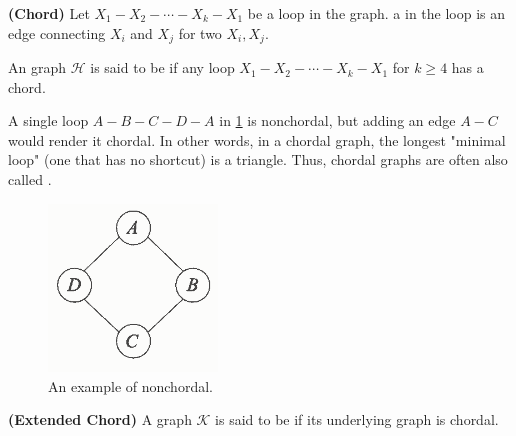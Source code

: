 \documentclass{article}
\newcommand{\bfs}[1]{\textbf{({#1}) }}
\begin{document}
\begin{defa}\bfs{Chord}
Let $X_{1}-X_{2}-\cdots-X_{k}-X_{1}$ be a loop in the graph. a  in the loop is an edge connecting $X_{i}$ and $X_{j}$ for two  $X_{i}, X_{j}$. 

An  graph $\mathcal{H}$ is said to be  if any loop $X_{1}-X_{2}-\cdots-X_{k}-X_{1}$ for $k \geq 4$ has a chord.
\end{defa}

\begin{exma}%
A single loop $A-B-C-D-A$ in \cref{fig:nonchordal} is nonchordal, but adding an edge $A-C$ would render it chordal. In other words, in a chordal graph, the longest "minimal loop" (one that has no shortcut) is a triangle. Thus, chordal graphs are often also called .
\end{exma}
\begin{figure}
    \centering
    \includegraphics[width=0.4\textwidth]{Figs/a3.png}
    \caption{An example of nonchordal.}
    \label{fig:nonchordal}
\end{figure}
\begin{defa}\bfs{Extended Chord}
A graph $\mathcal{K}$ is said to be  if its underlying  graph is chordal.
\end{defa}
\end{document}
